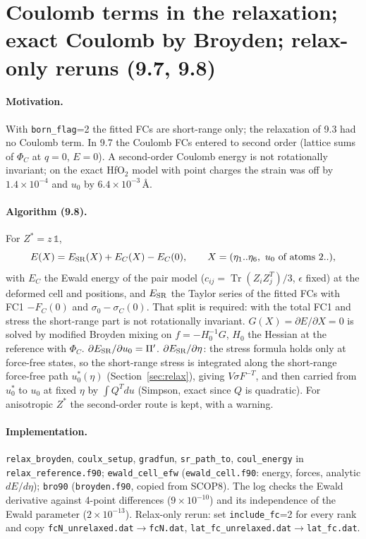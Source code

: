 \documentclass[11pt,a4paper]{article}
\newcommand{\code}[1]{\texttt{#1}}
\newcommand{\Tr}{\operatorname{Tr}}
\begin{document}
\section{Coulomb terms in the relaxation; exact Coulomb by Broyden; relax-only reruns (9.7, 9.8)}\label{sec:coulrelax}
\paragraph{Motivation.} With \code{born\_flag}=2 the fitted FCs are short-range only; the relaxation of 9.3
had no Coulomb term. In 9.7 the Coulomb FCs entered to second order (lattice sums of $\Phi_C$ at $q=0$,
$E=0$). A second-order Coulomb energy is not rotationally invariant; on the exact HfO$_2$ model with point
charges the strain was off by $1.4\times10^{-4}$ and $u_0$ by $6.4\times10^{-3}$\,\AA.

\paragraph{Algorithm (9.8).} For $Z^*=z\,\mathbb 1$,
\begin{equation}
E(X)=E_{\rm SR}(X)+E_C(X)-E_C(0),\qquad X=(\eta_1..\eta_6,\ u_0\text{ of atoms }2..),
\end{equation}
with $E_C$ the Ewald energy of the pair model ($c_{ij}=\Tr(Z_iZ_j^T)/3$, $\epsilon$ fixed) at the deformed
cell and positions, and $E_{\rm SR}$ the Taylor series of the fitted FCs with FC1 $-F_C(0)$ and
$\sigma_0-\sigma_C(0)$. That split is required: with the total FC1 and stress the short-range part is not
rotationally invariant. $G(X)=\partial E/\partial X=0$ is solved by modified Broyden mixing on
$f=-H_0^{-1}G$, $H_0$ the Hessian at the reference with $\Phi_C$. $\partial E_{\rm SR}/\partial u_0=\Pi'$.
$\partial E_{\rm SR}/\partial\eta$: the stress formula holds only at force-free states, so the short-range
stress is integrated along the short-range force-free path $u_0^*(\eta)$ (Section~\ref{sec:relax}), giving
$V\sigma F^{-T}$, and then carried from $u_0^*$ to $u_0$ at fixed $\eta$ by $\int Q^Tdu$ (Simpson, exact since
$Q$ is quadratic). For anisotropic $Z^*$ the second-order route is kept, with a warning.

\paragraph{Implementation.} \code{relax\_broyden}, \code{coulx\_setup}, \code{gradfun}, \code{sr\_path\_to},
\code{coul\_energy} in \code{relax\_reference.f90}; \code{ewald\_cell\_efw} (\code{ewald\_cell.f90}: energy,
forces, analytic $dE/d\eta$); \code{bro90} (\code{broyden.f90}, copied from SCOP8). The log checks the Ewald
derivative against 4-point differences ($9\times10^{-10}$) and its independence of the Ewald parameter
($2\times10^{-13}$). Relax-only rerun: set \code{include\_fc}=2 for every rank and copy
\code{fcN\_unrelaxed.dat}$\to$\code{fcN.dat}, \code{lat\_fc\_unrelaxed.dat}$\to$\code{lat\_fc.dat}.
\end{document}
